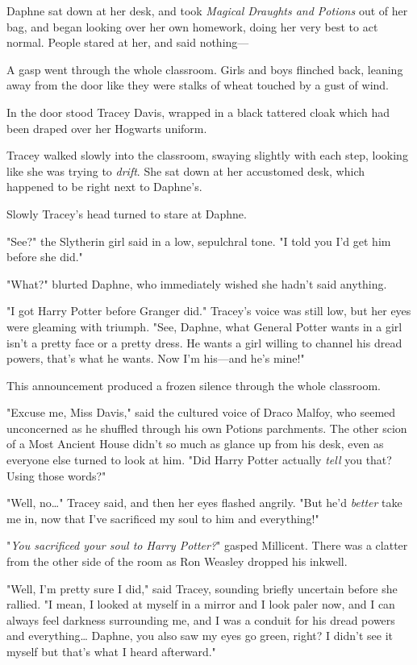 Daphne sat down at her desk, and took \emph{Magical Draughts and Potions} out 
of her bag, and began looking over her own homework, doing her very best to act 
normal. People stared at her, and said nothing---

A gasp went through the whole classroom. Girls and boys flinched back, leaning 
away from the door like they were stalks of wheat touched by a gust of wind.

In the door stood Tracey Davis, wrapped in a black tattered cloak which had 
been draped over her Hogwarts uniform.

Tracey walked slowly into the classroom, swaying slightly with each step, 
looking like she was trying to \emph{drift}. She sat down at her accustomed 
desk, which happened to be right next to Daphne's.

Slowly Tracey's head turned to stare at Daphne.

"See?" the Slytherin girl said in a low, sepulchral tone. "I told you I'd get 
him before she did."

"What?" blurted Daphne, who immediately wished she hadn't said anything.

"I got Harry Potter before Granger did." Tracey's voice was still low, but her 
eyes were gleaming with triumph. "See, Daphne, what General Potter wants in a 
girl isn't a pretty face or a pretty dress. He wants a girl willing to channel 
his dread powers, that's what he wants. Now I'm his---and he's mine!"

This announcement produced a frozen silence through the whole classroom.

"Excuse me, Miss Davis," said the cultured voice of Draco Malfoy, who seemed 
unconcerned as he shuffled through his own Potions parchments. The other scion 
of a Most Ancient House didn't so much as glance up from his desk, even as 
everyone else turned to look at him. "Did Harry Potter actually \emph{tell} you 
that? Using those words?"

"Well, no{\ldots}" Tracey said, and then her eyes flashed angrily. "But he'd 
\emph{better} take me in, now that I've sacrificed my soul to him and 
everything!"

"\emph{You sacrificed your soul to Harry Potter?}" gasped Millicent. There was 
a clatter from the other side of the room as Ron Weasley dropped his inkwell.

"Well, I'm pretty sure I did," said Tracey, sounding briefly uncertain before 
she rallied. "I mean, I looked at myself in a mirror and I look paler now, and 
I can always feel darkness surrounding me, and I was a conduit for his dread 
powers and everything{\ldots} Daphne, you also saw my eyes go green, right? I 
didn't see it myself but that's what I heard afterward."

